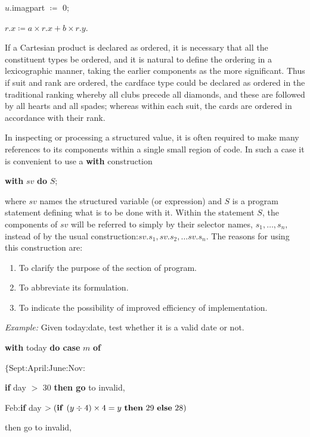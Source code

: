 \quad $u$.imagpart $\coloneq$ 0;

\quad $r.x \coloneq a\times r.x + b\times r.y$.

If a Cartesian product is declared as ordered, it is necessary that all the constituent types be ordered, and it is natural to define the ordering in a lexicographic manner, taking the earlier components as the more significant. Thus if suit and rank are ordered, the cardface type could be declared as ordered in the traditional ranking whereby all clubs precede all diamonds, and these are followed by all hearts and all spades; whereas within each suit, the cards are ordered in accordance with their rank.

In inspecting or processing a structured value, it is often required to make many references to its components within a single small region of code. In such a case it is convenient to use a \textbf{with} construction

\quad \textbf{with} $sv$ \textbf{do} $S$;

\noindent
where $sv$ names the structured variable (or expression) and $S$ is a program statement defining what is to be done with it. Within the statement $S$, the components of $sv$ will be referred to simply by their selector names, $s_1, \dots, s_n,$ instead of by the usual construction:$sv.s_1, sv.s_2, \dots sv.s_n$. The reasons for using this construction are:

\begin{enumerate}[wide, nosep, label=(\arabic*)]
	\item To clarify the purpose of the section of program.
	\item To abbreviate its formulation.
	\item To indicate the possibility of improved efficiency of implementation.
\end{enumerate}

\noindent
\textit{Example:} Given today:date, test whether it is a valid date or not.

\quad \textbf{with} today \textbf{do case} $m$ \textbf{of}

\quad \quad $\{$Sept:April:June:Nov:

\quad \quad \quad \textbf{if} day $>$ 30 \textbf{then go} to invalid,

\quad \quad \quad Feb:\textbf{if} day $> (\text{\textbf{if }} (y \div 4) \times 4 = y \text{ \textbf{then} } 29 \text{ \textbf{else} } 28)$

\quad \quad \quad \quad then go to invalid,

